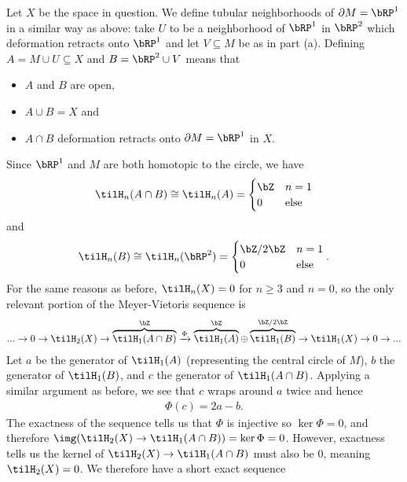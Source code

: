 \begin{homework}[e]
\begin{prf}
    Let $X$ be the space in question. We define tubular neighborhoods of $\partial M = \bRP^1$ in a similar way as above: take $U$ to be a neighborhood of $\bRP^1$ in $\bRP^2$ which deformation retracts onto $\bRP^1$ and let $V\subseteq M$ be as in part (a). Defining $A = M\cup U\subseteq X$ and $B = \bRP^2 \cup V$ means that
    \begin{itemize}
      \item $A$ and $B$ are open,
      \item $A\cup B = X$ and
      \item $A\cap B$ deformation retracts onto $\partial M = \bRP^1$ in $X$.
    \end{itemize}
    Since $\bRP^1$ and $M$ are both homotopic to the circle, we have
    \begin{align*}
      \tilH_n(A\cap B) \cong \tilH_n(A) = 
      \begin{cases}
        \bZ & n = 1 \\
        0 & \text{else}
      \end{cases}
    \end{align*}
    and
    \begin{align*}
      \tilH_n(B) \cong \tilH_n(\bRP^2) =
      \begin{cases}
        \bZ/2\bZ & n = 1 \\
        0 & \text{else}
      \end{cases}.
    \end{align*}
    For the same reasons as before, $\tilH_n(X) = 0$ for $n \geq 3$ and $n = 0$, so the only relevant portion of the Meyer-Vietoris sequence is
    \begin{align*}
      ... \to 0 \to \tilH_2(X) \to \overbrace{\tilH_1(A\cap B)}^{\bZ} \xrightarrow{\Phi} \overbrace{\tilH_1(A)}^{\bZ}\oplus \overbrace{\tilH_1(B)}^{\bZ/2\bZ} \to \tilH_1(X) \to 0 \to ...
    \end{align*}
    Let $a$ be the generator of $\tilH_1(A)$ (representing the central circle of $M$), $b$ the generator of $\tilH_1(B)$, and $c$ the generator of $\tilH_1(A\cap B)$. Applying a similar argument as before, we see that $c$ wraps around $a$ twice and hence
    \begin{align*}
      \Phi(c) = 2a - b.
    \end{align*}
    The exactness of the sequence tells us that $\Phi$ is injective so $\ker\Phi = 0$, and therefore $\img(\tilH_2(X) \to \tilH_1(A\cap B)) = \ker \Phi = 0$. However, exactness tells us the kernel of $\tilH_2(X)\to \tilH_1(A\cap B)$ must also be $0$, meaning $\tilH_2(X) = 0$. We therefore have a short exact sequence

\end{prf}
\end{homework}
